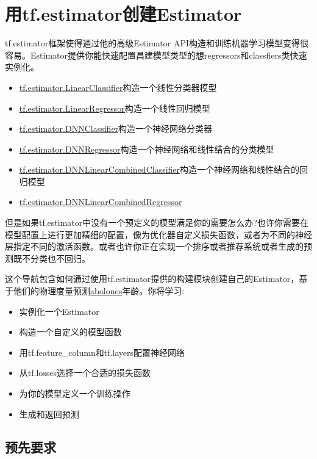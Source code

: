 \section{用tf.estimator创建Estimator}
tf.estimator框架使得通过他的高级Estimator API构造和训练机器学习模型变得很容易。Estimator提供你能快速配置昌建模型类型的想regressors和classfiers类快速实例化。
\begin{itemize}
	\item \href{https://www.tensorflow.org/api_docs/python/tf/estimator/LinearClassifier}{tf.estimator.LinearClassifier}构造一个线性分类器模型
	\item \href{https://www.tensorflow.org/api_docs/python/tf/estimator/LinearRegressor}{tf.estimator.LinearRegressor}构造一个线性回归模型
	\item \href{https://www.tensorflow.org/api_docs/python/tf/estimator/DNNClassifier}{tf.estimator.DNNClassifier}构造一个神经网络分类器
	\item \href{https://www.tensorflow.org/api_docs/python/tf/estimator/DNNRegressor}{tf.estimator.DNNRegressor}构造一个神经网络和线性结合的分类模型
	\item \href{https://www.tensorflow.org/api_docs/python/tf/estimator/DNNLinearCombinedClassifier}{tf.estimator.DNNLinearCombinedClassifier}构造一个神经网络和线性结合的回归模型
	\item \href{https://www.tensorflow.org/api_docs/python/tf/estimator/DNNLinearCombinedRegressor}{tf.estimator.DNNLinearCombinedRegressor}
\end{itemize}
但是如果tf.estimator中没有一个预定义的模型满足你的需要怎么办?也许你需要在模型配置上进行更加精细的配置，像为优化器自定义损失函数，或者为不同的神经层指定不同的激活函数。或者也许你正在实现一个排序或者推荐系统或者生成的预测既不分类也不回归。

这个导航包含如何通过使用tf.estimator提供的构建模块创建自己的Estimator，基于他们的物理度量预测\href{https://en.wikipedia.org/wiki/Abalone}{abalones}年龄。你将学习:
\begin{itemize}
	\item 实例化一个Estimator
	\item 构造一个自定义的模型函数
	\item 用tf.feature\_column和tf.layers配置神经网络
	\item 从tf.losses选择一个合适的损失函数
	\item 为你的模型定义一个训练操作
	\item 生成和返回预测
\end{itemize}
\subsection{预先要求}

